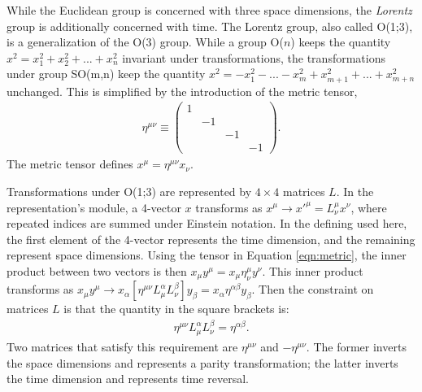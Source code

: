 While the Euclidean group is concerned with three space dimensions, the \emph{Lorentz} group is additionally concerned with time.
The Lorentz group, also called O(1;3), is a generalization of the O(3) group. 
While a group O($n$) keeps the quantity $x^2=x_1^2+x_2^2+...+x_{n}^2$ invariant under transformations, the transformations under group SO(m,n) keep the quantity \mbox{$x^2=-x_1^2-...-x_{m}^2+x_{m+1}^2+...+x_{m+n}^2$} unchanged.
This is simplified by the introduction of the metric tensor,
\begin{equation}\begin{split}\label{eqn:metric}
    \eta^{\mu\nu}\equiv\begin{pmatrix}1&&&\\&-1&&\\&&-1&\\&&&-1\end{pmatrix}.
\end{split}\end{equation}
The metric tensor defines $x^\mu=\eta^{\mu\nu}x_\nu$.

Transformations under O(1;3) are represented by $4\times4$ matrices $L$.
In the representation's module, a 4-vector $x$ transforms as $x^\mu\to x'^\mu=L_\nu^\mu x^\nu$, where repeated indices are summed under Einstein notation.
In the defining used here, the first element of the 4-vector represents the time dimension, and the remaining represent space dimensions.
Using the tensor in Equation \ref{eqn:metric}, the inner product between two vectors is then $x_\mu y^\mu=x_\mu\eta^\mu_\nu y^\nu$.
This inner product transforms as $x_\mu y^\mu\to x_\alpha [\eta^{\mu\nu}L_\mu^\alpha L_\nu^\beta] y_\beta=x_\alpha\eta^{\alpha\beta}y_\beta$.
Then the constraint on matrices $L$ is that the quantity in the square brackets is:
\begin{equation}\begin{split}\label{eqn:lorentzReq}
    \eta^{\mu\nu}L_\mu^\alpha L_\nu^\beta=\eta^{\alpha\beta}.
\end{split}\end{equation} 
Two matrices that satisfy this requirement are $\eta^{\mu\nu}$ and $-\eta^{\mu\nu}$.
The former inverts the space dimensions and represents a parity transformation; the latter inverts the time dimension and represents time reversal.


